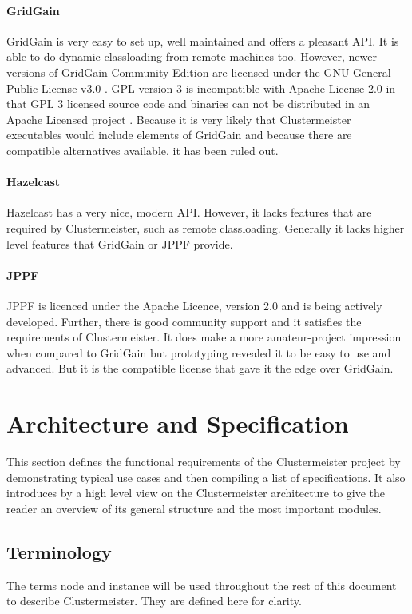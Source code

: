 \documentclass[english]{uzhpub}
\begin{document}
\paragraph{GridGain} GridGain is very easy to set up, well maintained and offers a pleasant API. It is able to do dynamic classloading from remote machines too. However, newer versions of GridGain Community Edition are licensed under the GNU General Public License v3.0 \cite{gpl3}. GPL version 3 is incompatible with Apache License 2.0 in that GPL 3 licensed source code and binaries can not be distributed in an Apache Licensed project \cite{asf-legal-faq}. Because it is very likely that Clustermeister executables would include elements of GridGain and because there are compatible alternatives available, it has been ruled out.

\paragraph{Hazelcast} Hazelcast has a very nice, modern API. However, it lacks features that are required by Clustermeister, such as remote classloading. Generally it lacks higher level features that GridGain or JPPF provide.

\paragraph{JPPF} JPPF is licenced under the Apache Licence, version 2.0 and is being actively developed. Further, there is good community support and it satisfies the requirements of Clustermeister. It does make a more amateur-project impression when compared to GridGain but prototyping revealed it to be easy to use and advanced. But it is the compatible license that gave it the edge over GridGain.

\section{Architecture and Specification}
\label{architecture}
This section defines the functional requirements of the Clustermeister project by demonstrating typical use cases and then compiling a list of specifications. It also introduces by a high level view on the Clustermeister architecture to give the reader an overview of its general structure and the most important modules.

\subsection{Terminology}
The terms node and instance will be used throughout the rest of this document to describe Clustermeister. They are defined here for clarity.
 
\end{document}
